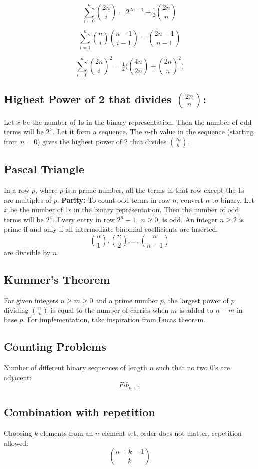 \documentclass{article}
\begin{document}
\[
\sum_{i=0}^n \binom{2n}{i} = 2^{2n-1} + \tfrac{1}{2}\binom{2n}{n}
\]

\[
\sum_{i=1}^n \binom{n}{i}\binom{n-1}{i-1} = \binom{2n-1}{n-1}
\]

\[
\sum_{i=0}^n \binom{2n}{i}^2 = \tfrac{1}{2}\Big( \binom{4n}{2n} + \binom{2n}{n}^2 \Big)
\]


\subsection{Highest Power of 2 that divides $\binom{2n}{n}$:}  
Let $x$ be the number of 1s in the binary representation. Then the number of odd terms will be $2^x$. Let it form a sequence. The $n$-th value in the sequence (starting from $n=0$) gives the highest power of 2 that divides $\binom{2n}{n}$.


\subsection*{Pascal Triangle}
In a row $p$, where $p$ is a prime number, all the terms in that row except the 1s are multiples of $p$. \textbf{Parity:} To count odd terms in row $n$, convert $n$ to binary. Let $x$ be the number of 1s in the binary representation. Then the number of odd terms will be $2^x$. Every entry in row $2^n-1, \; n\geq0$, is odd.
An integer $n\geq 2$ is prime if and only if all intermediate binomial coefficients are inserted.
\[
\binom{n}{1}, \binom{n}{2}, \dots, \binom{n}{n-1}
\] are divisible by $n$.

\subsection{Kummer’s Theorem} 
For given integers $n \geq m \geq 0$ and a prime number $p$, the largest power of $p$ dividing $\binom{n}{m}$ is equal to the number of carries when $m$ is added to $n-m$ in base $p$. For implementation, take inspiration from Lucas theorem.

\subsection{Counting Problems}
Number of different binary sequences of length $n$ such that no two 0’s are adjacent:
\[
Fib_{n+1}
\]

\subsection{Combination with repetition}
Choosing $k$ elements from an $n$-element set, order does not matter, repetition allowed:
\[
\binom{n+k-1}{k}
\]
\end{document}
